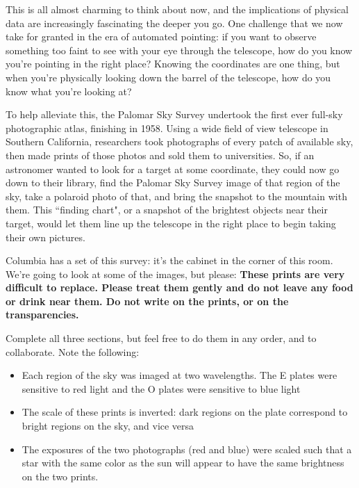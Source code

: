 \documentclass[11pt]{article}
\begin{document}
\medskip \noindent
This is all almost charming to think about now, and the implications of physical data are increasingly fascinating the deeper you go. One challenge that we now take for granted in the era of automated pointing: if you want to observe something too faint to see with your eye through the telescope, how do you know you're pointing in the right place? Knowing the coordinates are one thing, but when you're physically looking down the barrel of the telescope, how do you know what you're looking at?

\medskip \noindent
To help alleviate this, the Palomar Sky Survey undertook the first ever full-sky photographic atlas, finishing in 1958. Using a wide field of view telescope in Southern California, researchers took photographs of every patch of available sky, then made prints of those photos and sold them to universities. So, if an astronomer wanted to look for a target at some coordinate, they could now go down to their library, find the Palomar Sky Survey image of that region of the sky, take a polaroid photo of that, and bring the snapshot to the mountain with them. This ``finding chart", or a snapshot of the brightest objects near their target, would let them line up the telescope in the right place to begin taking their own pictures.

\medskip \noindent
Columbia has a set of this survey: it's the cabinet in the corner of this room. We're going to look at some of the images, but please: \textbf{These prints are very difficult to replace. Please treat them gently and do not leave any food or drink near them. Do not write on the prints, or on the transparencies.}

\medskip \noindent
Complete all three sections, but feel free to do them in any order, and to collaborate. Note the following:
\begin{itemize}
    \item Each region of the sky was imaged at two wavelengths. The E plates were sensitive to red light and the O plates were sensitive to blue light
    \item The scale of these prints is inverted: dark regions on the plate correspond to bright regions on the sky, and vice versa
    \item The exposures of the two photographs (red and blue) were scaled such that a star with the same color as the sun will appear to have the same brightness on the two prints.
\end{itemize}
\end{document}
